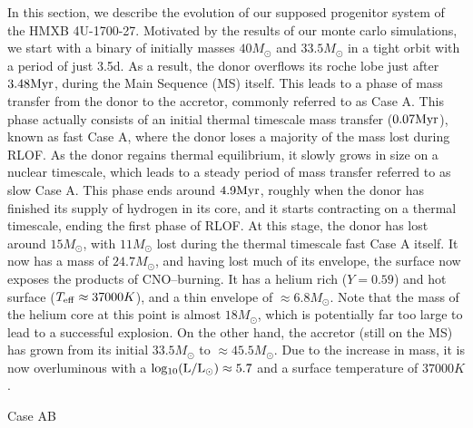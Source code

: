 \documentclass[linenumbers,trackchanges,twocolumn]{aastex701}
\begin{document}
In this section, we describe the evolution of our supposed progenitor system of the HMXB 4U-1700-27. Motivated by the results of our monte carlo simulations, we start with a binary of initially masses $40M_{\odot}$ and $33.5M_{\odot}$ in a tight orbit with a period of just 3.5d. As a result, the donor overflows its roche lobe just after $3.48 \rm Myr$, during the Main Sequence (MS) itself. This leads to a phase of mass transfer from the donor to the accretor, commonly referred to as Case A. This phase actually consists of an initial thermal timescale mass transfer ($0.07\rm Myr$), known as fast Case A, where the donor loses a majority of the mass lost during RLOF. As the donor regains thermal equilibrium, it slowly grows in size on a nuclear timescale, which leads to a steady period of mass transfer referred to as slow Case A. This phase ends around $4.9\rm Myr$, roughly when the donor has finished its supply of hydrogen in its core, and it starts contracting on a thermal timescale, ending the first phase of RLOF. At this stage, the donor has lost around $15M_{\odot}$, with $11M_{\odot}$ lost during the thermal timescale fast Case A itself. It now has a mass of $24.7M_{\odot}$, and having lost much of its envelope, the surface now exposes the products of CNO--burning. It has a helium rich ($Y = 0.59$) and hot surface ($T_{\rm eff} \approx 37000K$), and a thin envelope of $\approx 6.8M_{\odot}$. Note that the mass of the helium core at this point is almost $18M_{\odot}$, which is potentially far too large to lead to a successful explosion. On the other hand, the accretor (still on the MS) has grown from its initial $33.5M_{\odot}$ to $\approx 45.5M_{\odot}$. Due to the increase in mass, it is now overluminous with a $\rm log_{10} (L/L_{\odot}) \approx 5.7$ and a surface temperature of $37000K$.

Case AB
\end{document}
